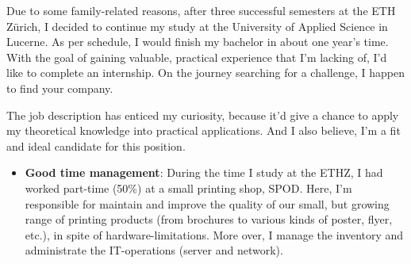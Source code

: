 \documentclass[11pt, a4paper]{awesome-cv}
\begin{document}
\makecvheader

\makelettertitle

\begin{cvletter}


Due to some family-related reasons, after three successful semesters at the ETH Zürich, I decided to continue my study at the University of Applied Science in Lucerne. As per schedule, I would finish my bachelor in about one year's time. With the goal of gaining valuable, practical experience that I'm lacking of, I'd like to complete an internship. On the journey searching for a challenge, I happen to find your company.


The job description has enticed my curiosity, because it'd give a chance to apply my theoretical knowledge into practical applications. And I also believe, I'm a fit and ideal candidate for this position.

\begin{itemize}[leftmargin=*]

	\item \textbf{Good time management}: During the time I study at the ETHZ, I had worked part-time (50\%) at a small printing shop, SPOD. Here, I'm responsible for maintain and improve the quality of our small, but growing range of printing products (from brochures to various kinds of poster, flyer, etc.), in spite of hardware-limitations. More over, I manage the inventory and administrate the IT-operations (server and network).  
	

\end{itemize}
\end{cvletter}
\end{document}
